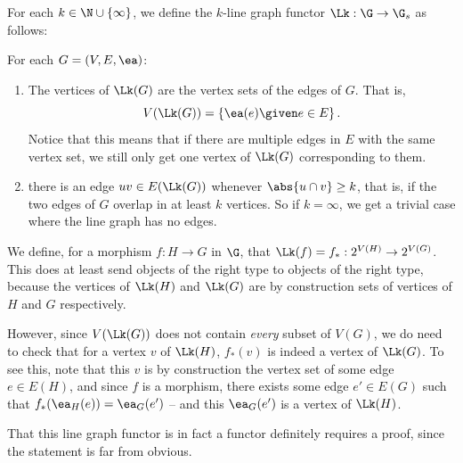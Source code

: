 \documentclass[a4paper,reqno,oneside]{article} %
\begin{document}
\begin{definition}
    For each $k \in \N \cup \{\infty\}$, we define the $k$-line graph functor $\Lk: \G \to \G_s$ as follows:
    
    For each $G = (V,E,\ea)$:
    \begin{enumerate}
        \item The vertices of $\Lk(G)$ are the vertex sets of the edges of $G$. That is, 
        $$V(\Lk(G)) = \left\{\ea(e) \given e \in E\right\}.$$
        Notice that this means that if there are multiple edges in $E$ with the same vertex set, we still only get one vertex of $\Lk(G)$ corresponding to them.
        \item there is an edge $uv \in E(\Lk(G))$ whenever $\abs{u \cap v} \geq k$, that is, if the two edges of $G$ overlap in at least $k$ vertices. So if $k = \infty$, we get a trivial case where the line graph has no edges.
    \end{enumerate}

    We define, for a morphism $f: H \to G$ in $\G$, that $\Lk(f) = f_*: 2^{V(H)} \to 2^{V(G)}$. This does at least send objects of the right type to objects of the right type, because the vertices of $\Lk(H)$ and $\Lk(G)$ are by construction sets of vertices of $H$ and $G$ respectively.

    However, since $V(\Lk(G))$ does not contain \emph{every} subset of $V(G)$, we do need to check that for a vertex $v$ of $\Lk(H)$, $f_*(v)$ is indeed a vertex of $\Lk(G)$. To see this, note that this $v$ is by construction the vertex set of some edge $e \in E(H)$, and since $f$ is a morphism, there exists some edge $e' \in E(G)$ such that $f_*(\ea_H(e)) = \ea_G(e')$ -- and this $\ea_G(e')$ is a vertex of $\Lk(H)$.
\end{definition}

That this line graph functor is in fact a functor definitely requires a proof, since the statement is far from obvious.
\end{document}
